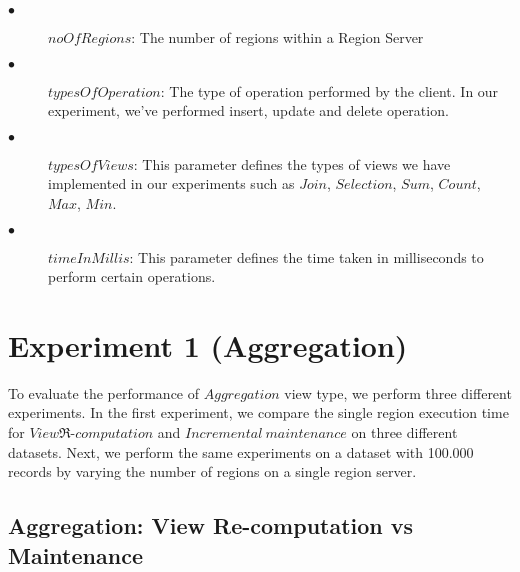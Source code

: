 \documentclass[11pt,a4paper,bibtotoc,idxtotoc,headsepline,footsepline,footexclude,BCOR12mm,DIV13]{scrbook}
\begin{document}
\begin{description}
	\item[$\bullet$]  $noOfRegions$: The number of regions within a Region Server 
\end{description}

\begin{description}
	\item[$\bullet$]  $typesOfOperation$: The type of operation performed by the client. In our experiment, we've performed insert, update and delete operation. 
\end{description}

\begin{description}
	\item[$\bullet$]  $typesOfViews$: This parameter defines the types of views we have implemented in our experiments such as $Join$, $Selection$, $Sum$, $Count$, $Max$, $Min$. 
\end{description}

\begin{description}
	\item[$\bullet$]  $timeInMillis$: This parameter defines the time taken in milliseconds to perform certain operations. 
\end{description}

\section{Experiment 1 (Aggregation)}
\label{(sec:AggrExp)}
To evaluate the performance of $Aggregation$ view type, we perform three different experiments. In the first experiment, we compare the single region execution time for $View\Re$-$computation$ and $Incremental \  maintenance$ on three different datasets. Next, we perform the same experiments on a dataset with 100.000 records by varying the number of regions on a single region server.
 
\subsection{Aggregation: View Re-computation vs Maintenance}
\end{document}

